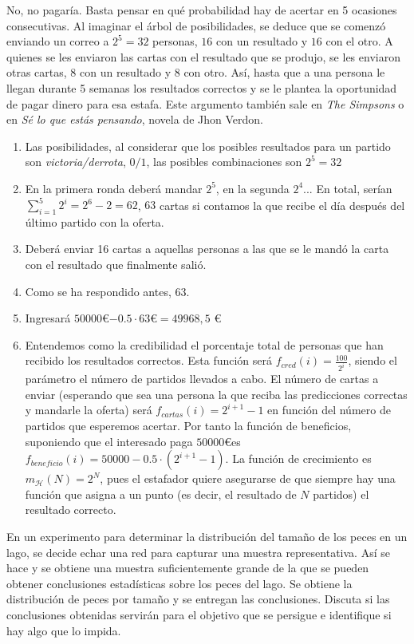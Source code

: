\documentclass[11pt,leqno]{article}
\theoremstyle{definition}
\begin{document}
\begin{solucion}
No, no pagaría. Basta pensar en qué probabilidad hay de acertar en 5 ocasiones consecutivas. Al imaginar el árbol de posibilidades, se deduce que se comenzó enviando un correo a $2^5= 32$ personas, $16$ con un resultado y $16$ con el otro. A quienes se les enviaron las cartas con el resultado que se produjo, se les enviaron otras cartas, 8 con un resultado y 8 con otro. Así, hasta que a una persona le llegan durante 5 semanas los resultados correctos y se le plantea la oportunidad de pagar dinero para esa estafa. Este argumento también sale en \textit{The Simpsons} o en \textit{Sé lo que estás pensando}, novela de Jhon Verdon.

\begin{enumerate}[a]
\item Las posibilidades, al considerar que los posibles resultados para un partido son \textit{victoria/derrota}, $0/1$, las posibles combinaciones son $2^5=32$
\item En la primera ronda deberá mandar $2^5$, en la segunda $2^4$... En total, serían $\sum\limits_{i=1}^5 2^i = 2^6-2 = 62$, $63$ cartas si contamos la que recibe el día después del último partido con la oferta.
\item Deberá enviar 16 cartas a aquellas personas a las que se le mandó la carta con el resultado que finalmente salió.
\item Como se ha respondido antes, 63.
\item  Ingresará $50000$\euro $-0.5 \cdot 63$\euro $= 49968,5$ \euro
\item Entendemos como la credibilidad el porcentaje total de personas que han recibido los resultados correctos. Esta función será  $f_{cred}(i) = \frac{100}{2^i}$, siendo el parámetro el número de partidos llevados a cabo. El número de cartas a enviar (esperando que sea una persona la que reciba las predicciones correctas y mandarle la oferta) será $f_{cartas}(i) = 2^{i+1}-1$ en función del número de partidos que esperemos acertar. Por tanto la función de beneficios, suponiendo que el interesado paga $50000$\euro es $f_{beneficio}(i)=50000 - 0.5 \cdot (2^{i+1}-1)$. La función de crecimiento es $m_\mathcal{H}(N) = 2^N$, pues el estafador quiere asegurarse de que siempre hay una función que asigna a un punto (es decir, el resultado de $N$ partidos) el resultado correcto. 
\end{enumerate}
\end{solucion}

\begin{cuestion}
	En un experimento para determinar la distribución del tamaño de los peces en un lago, se decide echar una red para capturar una muestra representativa. Así se hace y se obtiene una muestra suficientemente grande de la que se pueden obtener conclusiones estadísticas sobre los peces del lago. Se obtiene la distribución de peces por tamaño y se entregan las conclusiones. Discuta si las conclusiones obtenidas servirán para el objetivo que se persigue e identifique si hay algo que lo impida.
\end{cuestion}
\end{document}
